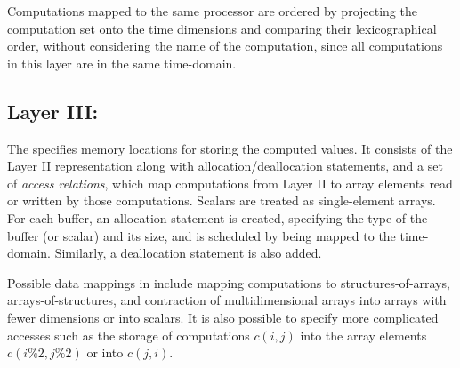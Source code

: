 


Computations mapped to the same processor are ordered by projecting the computation set onto the time dimensions and comparing their lexicographical order, without considering the name of the computation, since all computations in this layer are in the same time-\processor domain.



\subsection{Layer III: \Layerthree}
\label{layer3}

The \layerthree specifies memory locations for storing the computed values.  It consists of the Layer II representation along with allocation/deallocation statements, and a set of \emph{access relations},
which map computations from Layer II to array elements read or written by those computations.  Scalars are treated as single-element arrays.  %
For each buffer, an allocation statement is created, specifying the type of the buffer (or scalar) and its size, and is scheduled by being mapped to the time-\processor domain.  Similarly, a deallocation statement is also added.

Possible data mappings in \framework include mapping computations to structures-of-arrays, arrays-of-structures, and contraction of multidimensional arrays into arrays with fewer dimensions or into scalars.  It is also possible to specify more complicated accesses such as the storage of computations $c(i,j)$ into the array elements $c(i\%2,j\%2)$ or into $c(j,i)$.


